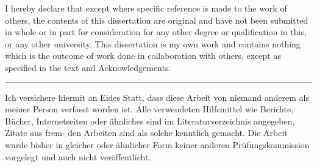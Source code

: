 
\begin{declaration}


I hereby declare that except where specific reference is made to the work of 
others, the contents of this dissertation are original and have not been 
submitted in whole or in part for consideration for any other degree or 
qualification in this, or any other university. This dissertation is my own 
work and contains nothing which is the outcome of work done in collaboration 
with others, except as specified in the text and Acknowledgements. 
\vspace{50pt}
\hrule
\vspace{50pt}
Ich versichere hiermit an Eides Statt, dass diese Arbeit von niemand anderem als meiner Person verfasst worden ist. Alle verwendeten Hilfsmittel wie Berichte, Bücher, Internetseiten oder ähnliches sind im Literaturverzeichnis angegeben, Zitate aus frem- den Arbeiten sind als solche kenntlich gemacht. Die Arbeit wurde bisher in gleicher oder ähnlicher Form keiner anderen Prüfungskommission vorgelegt und auch nicht veröffentlicht.

\end{declaration}